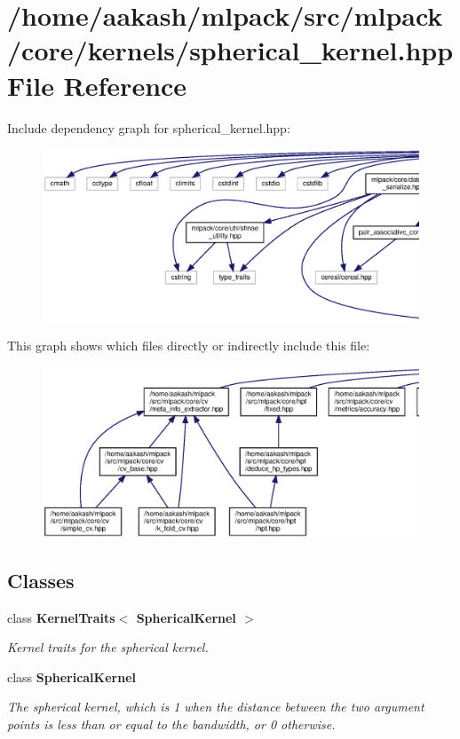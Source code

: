 \section{/home/aakash/mlpack/src/mlpack/core/kernels/spherical\+\_\+kernel.hpp File Reference}
\label{spherical__kernel_8hpp}
Include dependency graph for spherical\+\_\+kernel.\+hpp\+:
\nopagebreak
\begin{figure}[H]
\begin{center}
\leavevmode
\includegraphics[width=350pt]{spherical__kernel_8hpp__incl}
\end{center}
\end{figure}
This graph shows which files directly or indirectly include this file\+:
\nopagebreak
\begin{figure}[H]
\begin{center}
\leavevmode
\includegraphics[width=350pt]{spherical__kernel_8hpp__dep__incl}
\end{center}
\end{figure}
\subsection*{Classes}
\begin{DoxyCompactItemize}
\item 
class \textbf{ Kernel\+Traits$<$ Spherical\+Kernel $>$}
\begin{DoxyCompactList}\small\item\em Kernel traits for the spherical kernel. \end{DoxyCompactList}\item 
class \textbf{ Spherical\+Kernel}
\begin{DoxyCompactList}\small\item\em The spherical kernel, which is 1 when the distance between the two argument points is less than or equal to the bandwidth, or 0 otherwise. \end{DoxyCompactList}\end{DoxyCompactItemize}
